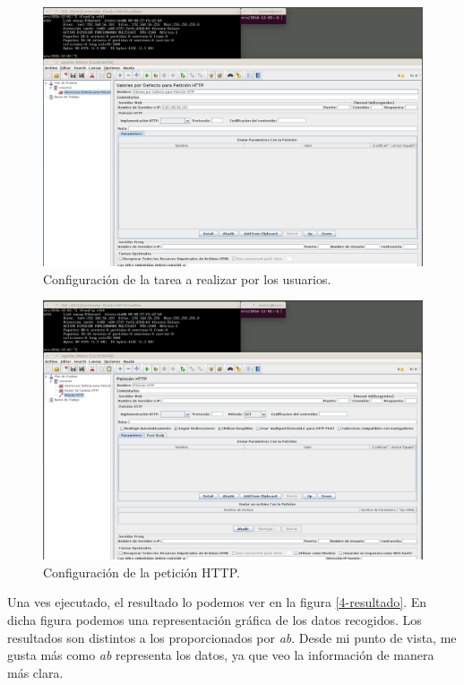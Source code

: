 \documentclass[a4paper,titlepage,12pt]{scrartcl}	%
\numberwithin{figure}{section} %
\numberwithin{table}{section} %
\begin{document}
	\begin{figure}[H]
		\centering
		\includegraphics[scale=0.26]{./Imagenes/4-2.png}
		\caption[Configuración de la tarea a realizar por los usuarios.]{Configuración de la tarea a realizar por los usuarios.}
		\label{4-2}
	\end{figure}
	
	\begin{figure}[H]
		\centering
		\includegraphics[scale=0.26]{./Imagenes/4-3.png}
		\caption[Configuración de la petición HTTP.]{Configuración de la petición HTTP.}
		\label{4-3}
	\end{figure}
	
	Una ves ejecutado, el resultado lo podemos ver en la figura \ref{4-resultado}. En dicha figura podemos una representación gráfica de los datos recogidos. Los resultados son distintos a los proporcionados por \textit{ab}. Desde mi punto de vista, me gusta más como \textit{ab} representa los datos, ya que veo la información de manera más clara.
	
\end{document}
